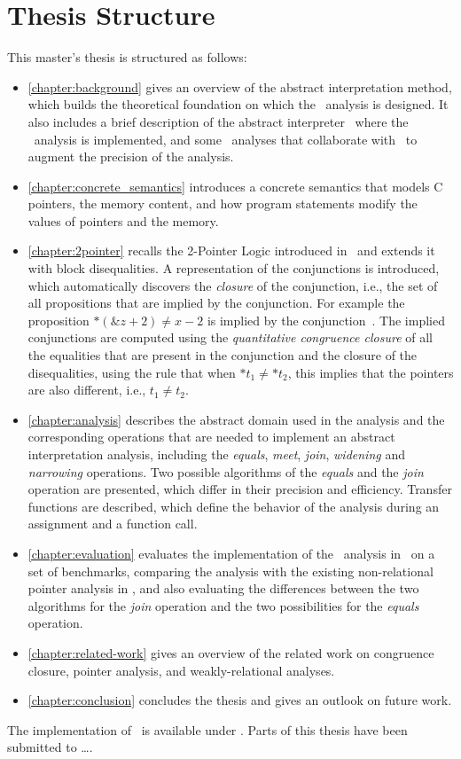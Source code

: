 \section{Thesis Structure}

This master's thesis is structured as follows:
\begin{itemize}
    \item \cref{chapter:background} gives an overview of the abstract interpretation method, which builds the theoretical foundation on which the \cpo\ analysis is designed.
          It also includes a brief description of the abstract interpreter \goblint\, where the \cpo\ analysis is implemented, and some \goblint\ analyses that collaborate with \cpo\ to augment the precision of the analysis.
    \item \cref{chapter:concrete_semantics} introduces a concrete semantics that models C pointers, the memory content, and how program statements modify the values of pointers and the memory.
    \item \cref{chapter:2pointer} recalls the 2-Pointer Logic introduced in~\cite{2pointer} and extends it with block disequalities.
          A representation of the conjunctions is introduced, which automatically discovers the \emph{closure} of the conjunction,
          i.e., the set of all propositions that are implied by the conjunction.
          For example the proposition $*(\&z + 2) \neq x - 2$ is implied by the conjunction~.
          The implied conjunctions are computed using the \emph{quantitative congruence closure} of all the equalities that are present in the conjunction and
          the closure of the disequalities, using the rule that when $*t_1 \neq *t_2$, this implies that the pointers are also different, i.e., $t_1 \neq t_2$.
    \item \cref{chapter:analysis} describes the abstract domain used in the analysis and the corresponding operations that are needed to implement an abstract interpretation analysis, including the \emph{equals}, \emph{meet}, \emph{join}, \emph{widening} and \emph{narrowing} operations.
          Two possible algorithms of the \emph{equals} and the \emph{join} operation are presented, which differ in
          their precision and efficiency.
          Transfer functions are described, which define the behavior of the analysis during an assignment and a function call.
    \item \cref{chapter:evaluation} evaluates the implementation of the \cpo\ analysis in \goblint\ on a set of benchmarks,
          comparing the analysis with the existing non-relational pointer analysis in \goblint, and also
          evaluating the differences between the two algorithms for the \emph{join} operation and the two possibilities for the \emph{equals} operation.
    \item \cref{chapter:related-work} gives an overview of the related work on congruence closure, pointer analysis, and weakly-relational analyses.
    \item \cref{chapter:conclusion} concludes the thesis and gives an outlook on future work.
\end{itemize}

The implementation of \cpo\ is available under . Parts of this thesis have been submitted to \dots.

